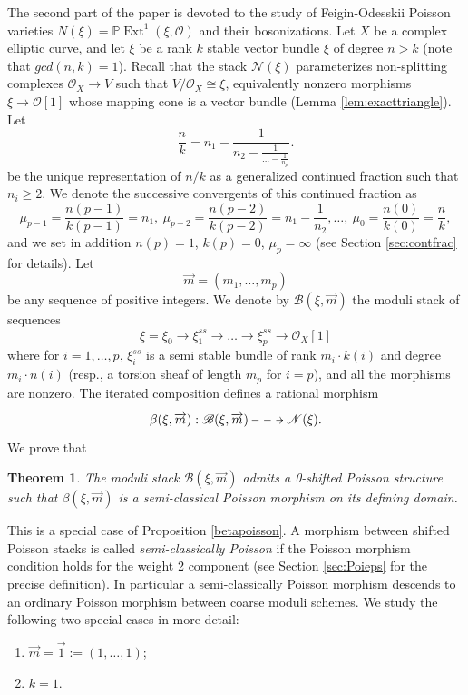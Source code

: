 \documentclass[reqno]{amsart}
\newtheorem{theorem}{Theorem}[section]
\theoremstyle{definition}
\theoremstyle{remark}
\renewcommand{\P}{{\mathbb P}}
\newcommand{\Ext}{\operatorname{Ext}}
\newcommand{\OO}{{\mathcal O}}
\newcommand{\cO}{\mathcal{O}}
\newcommand{\sB}{\mathscr{B}}
\newcommand{\sN}{\mathscr{N}}
\newcommand{\am}{\overrightarrow{m}}
\newcommand{\aone}{\overrightarrow{1}}
\newcommand{\amu}{\overrightarrow{\mu}}
\numberwithin{equation}{section}
\begin{document}
The second part of the paper is devoted to the study of Feigin-Odesskii Poisson varieties $N(\xi)=\P\Ext^1(\xi,\OO)$ and their bosonizations. Let $X$ be a complex elliptic curve, and let $\xi$ be a rank $k$ stable vector bundle $\xi$ of degree $n>k$ (note that $gcd(n,k)=1$). Recall that the stack $\sN(\xi)$ parameterizes non-splitting complexes $\cO_X\to V$ such that $V/\cO_X\cong \xi$, equivalently nonzero morphisms $\xi\to \cO[1]$ whose mapping cone is a vector bundle (Lemma \ref{lem:exacttriangle}). Let
\[
\frac{n}{k}=n_1-\frac{1}{n_2-\frac{1}{\ldots -\frac{1}{n_p}}}.
\] be the unique representation of $n/k$ as a generalized continued fraction such that $n_i\geq 2$. We denote the successive convergents of this continued fraction as 
$$\mu_{p-1}=\frac{n(p-1)}{k(p-1)}=n_1, \ \mu_{p-2}=\frac{n(p-2)}{k(p-2)}=n_1-\frac{1}{n_2}, \ldots, \ \mu_0=\frac{n(0)}{k(0)}=\frac{n}{k},$$
and we set in addition $n(p)=1$, $k(p)=0$, $\mu_p=\infty$
(see 
Section \ref{sec:contfrac} for details). Let 
\[
\am=(m_1,\ldots,m_p)
\] be any sequence of positive integers. 
We denote by $\sB(\xi,\am)$ the moduli stack of sequences
\[
\xi=\xi_0\to \xi_1^{ss}\to\ldots\to \xi_p^{ss}\to \cO_X[1]
\]  where for $i=1,\ldots,p$, $\xi_i^{ss}$ is a semi stable bundle of rank $m_i\cdot k(i)$ and degree $m_i\cdot n(i)$ (resp., a torsion sheaf of length $m_p$ for $i=p$), and all the morphisms are nonzero. The iterated composition defines a rational morphism 
\[\xymatrix{
\beta(\xi,\am): \sB(\xi,\am)\ar@{-->}[r] & \sN(\xi).}
\]
We prove that
\begin{theorem}
The moduli stack $\sB(\xi,\am)$ admits a 0-shifted Poisson structure such that $\beta(\xi,\am)$ is a semi-classical Poisson morphism on its defining domain. 
\end{theorem}
This is a special case of Proposition \ref{betapoisson}. A morphism between shifted Poisson stacks is called {\it semi-classically Poisson} if the Poisson morphism condition holds for the weight 2 component (see Section \ref{sec:Poieps} for the precise definition). In particular a semi-classically Poisson morphism descends to an ordinary Poisson morphism between coarse moduli schemes. We study the following two special cases in more detail:
\begin{enumerate}
\item[$(1)$] $\am=\aone:=(1,\ldots,1)$;
\item[$(2)$] $k=1$.
\end{enumerate}
\end{document}

